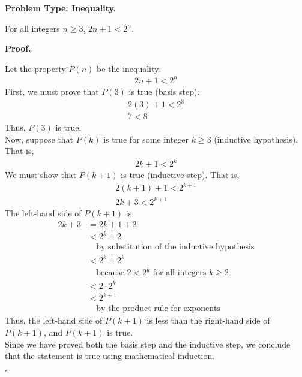 \documentclass{article}
\newenvironment{problem}[1]{
    \begin{mdframed}[backgroundcolor=gray!20, skipabove=\baselineskip, skipbelow=\baselineskip, nobreak=true, innerleftmargin=10pt, innerrightmargin=10pt, innertopmargin=10pt, innerbottommargin=10pt]
    \textbf{Problem #1.}
}{
    \end{mdframed}
}
\newenvironment{proof}{
    \begin{mdframed}[nobreak=true, innerleftmargin=10pt, innerrightmargin=10pt, innertopmargin=10pt, innerbottommargin=10pt]
    \textbf{Proof.}
}{
    \hfill $\square$
    \end{mdframed}
}
\begin{document}
        \begin{problem}{Type: Inequality}
            For all integers $n \geq 3$, $2n+1 < 2^n$.
        \end{problem}
        \begin{proof}
            Let the property $P(n)$ be the inequality:
            \begin{align*}
                2n+1 < 2^n
            \end{align*}
            First, we must prove that $P(3)$ is true (basis step).
            \begin{align*}
                2(3)+1 < 2^3 \\
                7 < 8
            \end{align*}
            Thus, $P(3)$ is true. \\
            Now, suppose that $P(k)$ is true for some integer $k \geq 3$ (inductive hypothesis). That is,
            \begin{align*}
                2k+1 < 2^k
            \end{align*}
            We must show that $P(k+1)$ is true (inductive step). That is,
            \begin{align*}
                2(k+1)+1 < 2^{k+1} \\
                2k+3 < 2^{k+1}
            \end{align*}
            The left-hand side of $P(k+1)$ is:
            \begin{align*}
                2k+3 &= 2k+1+2 \\
                &< 2^k+2 \\
                & \quad \text{by substitution of the inductive hypothesis} \\
                &< 2^k+2^k \\
                & \quad \text{because $2 < 2^k$ for all integers $k \geq 2$} \\
                &< 2 \cdot 2^k \\
                &< 2^{k+1} \\
                & \quad \text{by the product rule for exponents}
            \end{align*}
            Thus, the left-hand side of $P(k+1)$ is less than the right-hand side of $P(k+1)$, and $P(k+1)$ is true. \\
            Since we have proved both the basis step and the inductive step, we conclude that the statement is true using mathematical induction.
        \end{proof}
\end{document}

